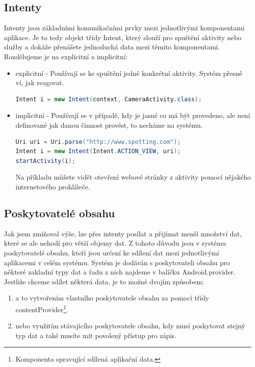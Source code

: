 \documentclass[12pt]{article}
\begin{document}
\subsection{Intenty}
Intenty jsou základními komunikačními prvky mezi jednotlivými komponentami aplikace. Je to tedy objekt třídy Intent, který slouží pro spuštění aktivity nebo služby a dokáže přenášete jednoduchá data mezi těmito komponentami. Rozdělujeme je na explicitní a implicitní:
\begin{itemize}
\item explicitní - Používají se ke spuštění jedné konkrétní aktivity. Systém přesně ví, jak reagovat.

\begin{lstlisting}[language=Java,
title=Ukázka explicitního intentu.,
basicstyle=\ttfamily\small\color{black},
commentstyle=\itshape,
keywordstyle=\color{Blue},
showstringspaces=false,
frame=lines,
backgroundcolor=\color{lightGrey}
]
Intent i = new Intent(context, CameraActivity.class);
\end{lstlisting}
\item implicitní - Používají se v případě, kdy je jasné co má být provedeno, ale není definované jak danou činnost provést, to necháme na systému.
\begin{lstlisting}[language=Java,
title=Ukázka implicitního intentu.,
basicstyle=\ttfamily\small\color{black},
commentstyle=\itshape,
keywordstyle=\color{Blue},
showstringspaces=false,
frame=lines,
backgroundcolor=\color{lightGrey}
]
Uri uri = Uri.parse("http://www.spotting.com");
Intent i = new Intent(Intent.ACTION_VIEW, uri);
startActivity(i);
\end{lstlisting}
Na příkladu můžete vidět otevření webové stránky z aktivity pomocí nějakého internetového prohlížeče.
\end{itemize}
\subsection{Poskytovatelé obsahu}
Jak jsem zmiňoval výše, lze přes intenty posílat a přijímat menší množství dat, které se ale nehodí pro větší objemy dat. Z tohoto důvodu jsou v systému poskytovatelé obsahu, kteří jsou určení ke sdílení dat mezi jednotlivými aplikacemi v celém systému. Systém je dodáván s poskytovateli obsahu pro některé zakladní typy dat a řadu z nich najdeme v balíčku Android.provider. Jestliže chceme sdílet některá data, je to možné dvojím způsobem:
\begin{enumerate}
\item a to vytvořením vlastního poskytovatele obsahu za pomocí třídy contentProvider\footnote[8]{Komponenta spravující sdílená aplikační data.}.
\item nebo využitím stávajícího poskytovatele obsahu, kdy musí poskytovat stejný typ dat a také musíte mít povolený přístup pro zápis.
\end{enumerate}
\end{document}
